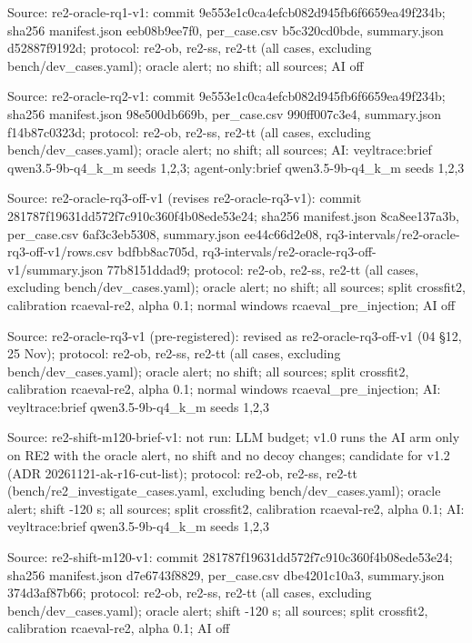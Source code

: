 \noindent Source: re2-oracle-rq1-v1: commit 9e553e1c0ca4efcb082d945fb6f6659ea49f234b; sha256 manifest.json eeb08b9ee7f0, per\_case.csv b5c320cd0bde, summary.json d52887f9192d; protocol: re2-ob, re2-ss, re2-tt (all cases, excluding bench/\allowbreak{}dev\_cases.yaml); oracle alert; no shift; all sources; AI off\par
\noindent Source: re2-oracle-rq2-v1: commit 9e553e1c0ca4efcb082d945fb6f6659ea49f234b; sha256 manifest.json 98e500db669b, per\_case.csv 990ff007c3e4, summary.json f14b87c0323d; protocol: re2-ob, re2-ss, re2-tt (all cases, excluding bench/\allowbreak{}dev\_cases.yaml); oracle alert; no shift; all sources; AI: veyltrace:brief qwen3.5-9b-q4\_k\_m seeds 1,2,3; agent-only:brief qwen3.5-9b-q4\_k\_m seeds 1,2,3\par
\noindent Source: re2-oracle-rq3-off-v1 (revises re2-oracle-rq3-v1): commit 281787f19631dd572f7c910c360f4b08ede53e24; sha256 manifest.json 8ca8ee137a3b, per\_case.csv 6af3c3eb5308, summary.json ee44c66d2e08, rq3-intervals/\allowbreak{}re2-oracle-rq3-off-v1/\allowbreak{}rows.csv bdfbb8ac705d, rq3-intervals/\allowbreak{}re2-oracle-rq3-off-v1/\allowbreak{}summary.json 77b8151ddad9; protocol: re2-ob, re2-ss, re2-tt (all cases, excluding bench/\allowbreak{}dev\_cases.yaml); oracle alert; no shift; all sources; split crossfit2, calibration rcaeval-re2, alpha 0.1; normal windows rcaeval\_pre\_injection; AI off\par
\noindent Source: re2-oracle-rq3-v1 (pre-registered): revised as re2-oracle-rq3-off-v1 (04 \S{}12, 25 Nov); protocol: re2-ob, re2-ss, re2-tt (all cases, excluding bench/\allowbreak{}dev\_cases.yaml); oracle alert; no shift; all sources; split crossfit2, calibration rcaeval-re2, alpha 0.1; normal windows rcaeval\_pre\_injection; AI: veyltrace:brief qwen3.5-9b-q4\_k\_m seeds 1,2,3\par
\noindent Source: re2-shift-m120-brief-v1: not run: LLM budget; v1.0 runs the AI arm only on RE2 with the oracle alert, no shift and no decoy changes; candidate for v1.2 (ADR 20261121-ak-r16-cut-list); protocol: re2-ob, re2-ss, re2-tt (bench/\allowbreak{}re2\_investigate\_cases.yaml, excluding bench/\allowbreak{}dev\_cases.yaml); oracle alert; shift -120 s; all sources; split crossfit2, calibration rcaeval-re2, alpha 0.1; AI: veyltrace:brief qwen3.5-9b-q4\_k\_m seeds 1,2,3\par
\noindent Source: re2-shift-m120-v1: commit 281787f19631dd572f7c910c360f4b08ede53e24; sha256 manifest.json d7e6743f8829, per\_case.csv dbe4201c10a3, summary.json 374d3af87b66; protocol: re2-ob, re2-ss, re2-tt (all cases, excluding bench/\allowbreak{}dev\_cases.yaml); oracle alert; shift -120 s; all sources; split crossfit2, calibration rcaeval-re2, alpha 0.1; AI off\par
